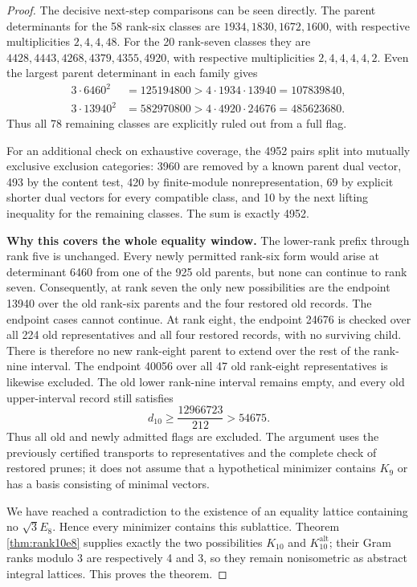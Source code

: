 \documentclass[11pt,a4paper]{article}
\theoremstyle{remark}\newtheorem{remark}[theorem]{Remark}
\newcommand{\Kalt}{K_{10}^{\mathrm{alt}}}
\begin{document}
\begin{proof}
The decisive next-step comparisons can be seen directly. The parent determinants for the 58 rank-six classes are $1934,1830,1672,1600$, with respective multiplicities $2,4,4,48$. For the 20 rank-seven classes they are $4428,4443,4268,4379,4355,4920$, with respective multiplicities $2,4,4,4,4,2$. Even the largest parent determinant in each family gives
\[
\begin{aligned}
3\cdot6460^2&=125194800>4\cdot1934\cdot13940=107839840,\\
3\cdot13940^2&=582970800>4\cdot4920\cdot24676=485623680.
\end{aligned}
\]
Thus all 78 remaining classes are explicitly ruled out from a full flag.

For an additional check on exhaustive coverage, the 4952 pairs split into mutually exclusive exclusion categories: 3960 are removed by a known parent dual vector, 493 by the content test, 420 by finite-module nonrepresentation, 69 by explicit shorter dual vectors for every compatible class, and 10 by the next lifting inequality for the remaining classes. The sum is exactly 4952.

\textbf{Why this covers the whole equality window.}
The lower-rank prefix through rank five is unchanged. Every newly permitted rank-six form would arise at determinant 6460 from one of the 925 old parents, but none can continue to rank seven. Consequently, at rank seven the only new possibilities are the endpoint 13940 over the old rank-six parents and the four restored old records. The endpoint cases cannot continue. At rank eight, the endpoint 24676 is checked over all 224 old representatives and all four restored records, with no surviving child. There is therefore no new rank-eight parent to extend over the rest of the rank-nine interval. The endpoint 40056 over all 47 old rank-eight representatives is likewise excluded. The old lower rank-nine interval remains empty, and every old upper-interval record still satisfies
\[
d_{10}\ge\frac{12966723}{212}>54675.
\]
Thus all old and newly admitted flags are excluded. The argument uses the previously certified transports to representatives and the complete check of restored prunes; it does not assume that a hypothetical minimizer contains $K_9$ or has a basis consisting of minimal vectors.

We have reached a contradiction to the existence of an equality lattice containing no $\sqrt3E_8$. Hence every minimizer contains this sublattice. Theorem \ref{thm:rank10e8} supplies exactly the two possibilities $K_{10}$ and $\Kalt$; their Gram ranks modulo 3 are respectively 4 and 3, so they remain nonisometric as abstract integral lattices. This proves the theorem.
\end{proof}
\end{document}

